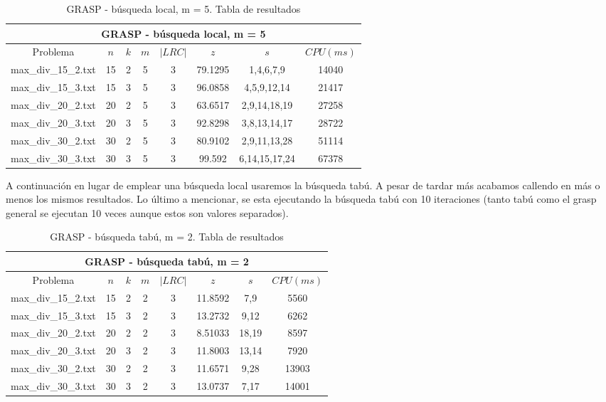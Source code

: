    \begin{table}[h]
   {\small
   \begin{center}
   \begin{tabular}{cccccccc}
      \multicolumn{8}{c}{GRASP - búsqueda local, m = 5} \\
      \hline
      Problema & $n$ & $k$ & $m$ & $|LRC|$ & $z$ & $s$ & $CPU(ms)$ \\
      \hline
      max\_div\_15\_2.txt & 15 & 2 & 5 & 3 & 79.1295 & 1,4,6,7,9 & 14040 \\
      max\_div\_15\_3.txt & 15 & 3 & 5 & 3 & 96.0858 & 4,5,9,12,14 & 21417 \\
      max\_div\_20\_2.txt & 20 & 2 & 5 & 3 & 63.6517 & 2,9,14,18,19 & 27258 \\
      max\_div\_20\_3.txt & 20 & 3 & 5 & 3 & 92.8298 & 3,8,13,14,17 & 28722 \\
      max\_div\_30\_2.txt & 30 & 2 & 5 & 3 & 80.9102 & 2,9,11,13,28 & 51114 \\
      max\_div\_30\_3.txt & 30 & 3 & 5 & 3 & 99.592 & 6,14,15,17,24 & 67378 \\
      \hline
   \end{tabular}
   \end{center}
   }
   \caption{GRASP - búsqueda local, m = 5. Tabla de resultados}
   \end{table}

\clearpage
A continuación en lugar de emplear una búsqueda local usaremos la búsqueda tabú. A pesar de tardar más acabamos callendo en más o menos los mismos resultados. Lo último a mencionar, se esta ejecutando la búsqueda tabú con 10 iteraciones (tanto tabú como el grasp general se ejecutan 10 veces aunque estos son valores separados).
   
   \begin{table}[h]
   {\small
   \begin{center}
   \begin{tabular}{cccccccc}
      \multicolumn{8}{c}{GRASP - búsqueda tabú, m = 2} \\
      \hline
      Problema & $n$ & $k$ & $m$ & $|LRC|$ & $z$ & $s$ & $CPU(ms)$ \\
      \hline
      max\_div\_15\_2.txt & 15 & 2 & 2 & 3 & 11.8592 & 7,9 & 5560 \\
      max\_div\_15\_3.txt & 15 & 3 & 2 & 3 & 13.2732 & 9,12 & 6262 \\
      max\_div\_20\_2.txt & 20 & 2 & 2 & 3 & 8.51033 & 18,19 & 8597 \\
      max\_div\_20\_3.txt & 20 & 3 & 2 & 3 & 11.8003 & 13,14 & 7920 \\
      max\_div\_30\_2.txt & 30 & 2 & 2 & 3 & 11.6571 & 9,28 & 13903 \\
      max\_div\_30\_3.txt & 30 & 3 & 2 & 3 & 13.0737 & 7,17 & 14001 \\
      \hline
   \end{tabular}
   \end{center}
   }
   \caption{GRASP - búsqueda tabú, m = 2. Tabla de resultados}
   \end{table}

